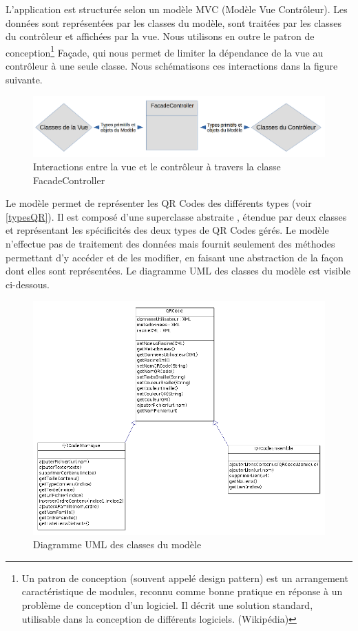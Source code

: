 \par
L'application est structurée selon un modèle MVC (Modèle Vue Contrôleur). Les données sont représentées par les classes du modèle, sont traitées par les classes du contrôleur et affichées par la vue. Nous utilisons en outre le patron de conception\footnote{Un patron de conception (souvent appelé design pattern) est un arrangement caractéristique de modules, reconnu comme bonne pratique en réponse à un problème de conception d'un logiciel. Il décrit une solution standard, utilisable dans la conception de différents logiciels. (Wikipédia)} Façade, qui nous permet de limiter la dépendance de la vue au contrôleur à une seule classe. Nous schématisons ces interactions dans la figure suivante.

\begin{figure}[!h]
	\centering
   \includegraphics[scale=0.25]{img/facade.png}
   \caption{Interactions entre la vue et le contrôleur à travers la classe FacadeController}
\end{figure}

\par
Le modèle permet de représenter les QR Codes des différents types (voir \ref{typesQR}). Il est composé d'une superclasse abstraite , étendue par deux classes  et  représentant les spécificités des deux types de QR Codes gérés. Le modèle n'effectue pas de traitement des données mais fournit seulement des méthodes permettant d'y accéder et de les modifier, en faisant une abstraction de la façon dont elles sont représentées. Le diagramme UML des classes du modèle est visible ci-dessous.

\begin{figure}[!h]
	\centering
   \includegraphics[scale=0.4]{img/modeleUML.png}
   \caption{Diagramme UML des classes du modèle}
\end{figure}

